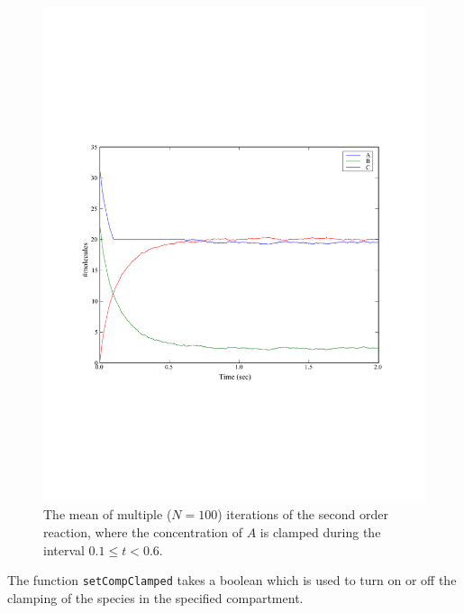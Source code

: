 \documentclass[a4paper,12pt]{book}
\begin{document}
\begin{figure}
\centering
\includegraphics[width=13cm]{secondorderreaction06.pdf}
\caption{The mean of multiple ($N=100$) iterations of the second order reaction, where the concentration of $A$ is clamped during the interval $0.1 \leq t < 0.6$.}
\label{fig:secondorderreaction06}
\end{figure}

The function \texttt{setCompClamped} takes a boolean which is used to turn on or off the clamping of the species in the specified compartment. 
\end{document}
